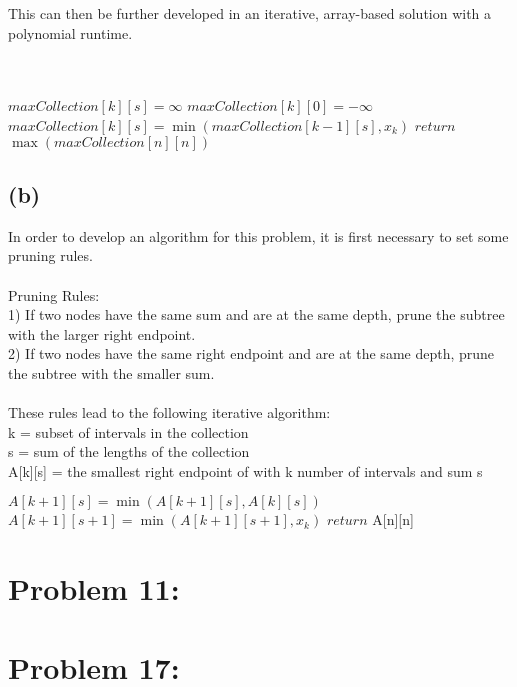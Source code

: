 \documentclass[12pt]{article}
\begin{document}
This can then be further developed in an iterative, array-based solution with a polynomial runtime.\\\\
\begin{algorithm}[H]
\Init\\
{
{$maxCollection[k][s] = \infty$}
}
{$maxCollection[k][0] = -\infty$}
\EndInit\\
{
{
{
{$maxCollection[k][s] = \min(maxCollection[k - 1][s], x_k)$}
}
}
}
{$return$ $\max(maxCollection[n][n])$}
\end{algorithm}
\subsection*{(b)}
In order to develop an algorithm for this problem, it is first necessary to set some pruning rules.\\\\
Pruning Rules: \\
1) If two nodes have the same sum and are at the same depth, prune the subtree with the larger right endpoint.\\
2) If two nodes have the same right endpoint and are at the same depth, prune the subtree with the smaller sum.\\\\
These rules lead to the following iterative algorithm:\\
k = subset of intervals in the collection\\
s = sum of the lengths of the collection\\
A[k][s] = the smallest right endpoint of with k number of intervals and sum s\\
\begin{algorithm}[H]
{
{
{$A[k+1][s] = \min(A[k+1][s], A[k][s])$}
{$A[k+1][s+1] = \min(A[k+1][s+1], x_k)$}
}
}
{$return$ A[n][n]}
\end{algorithm}
\section*{Problem 11: }
\section*{Problem 17: }
\end{document}
